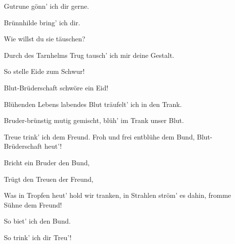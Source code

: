 \begin{drama}
\Guntherspeaks

Gutrune gönn' ich dir gerne.
 

\Siegfriedspeaks

Brünnhilde bring' ich dir.
 

\Guntherspeaks

Wie willst du sie täuschen?
 

\Siegfriedspeaks

Durch des Tarnhelms Trug
tausch' ich mir deine Gestalt.
 

\Guntherspeaks

So stelle Eide zum Schwur!
 

\Siegfriedspeaks

Blut-Brüderschaft schwöre ein Eid!
 






\Siegfriedspeaks

Blühenden Lebens labendes Blut
träufelt' ich in den Trank.
 

\Guntherspeaks

Bruder-brünstig mutig gemischt,
blüh' im Trank unser Blut.
 

Treue trink' ich dem Freund.
Froh und frei entblühe dem Bund,
Blut-Brüderschaft heut'!
 

\Guntherspeaks

Bricht ein Bruder den Bund,
 

\Siegfriedspeaks

Trügt den Treuen der Freund,
 

Was in Tropfen heut' hold wir tranken,
in Strahlen ström' es dahin,
fromme Sühne dem Freund!
 

\Guntherspeaks



So biet' ich den Bund.
 

\Siegfriedspeaks

So trink' ich dir Treu'!
 





\end{drama}
